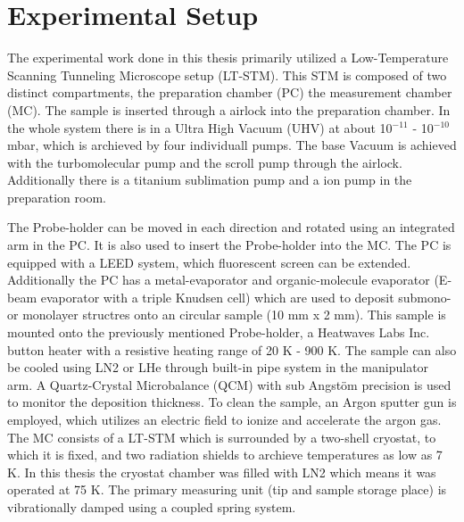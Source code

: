 \chapter{Experimental Setup}
\label{sec:versuchsandordnung}
The experimental work done in this thesis primarily utilized a Low-Temperature Scanning Tunneling Microscope setup (LT-STM).
This STM is composed of two distinct compartments, the preparation chamber (PC) the measurement chamber (MC).
The sample is inserted through a airlock into the preparation chamber.
In the whole system there is in a Ultra High Vacuum (UHV) at about 10$^{-11}$ - 10$^{-10}$ mbar, which is archieved by four individuall pumps.
The base Vacuum is achieved with the turbomolecular pump and the scroll pump through the airlock.
Additionally there is a titanium sublimation pump and a ion pump in the preparation room.


The Probe-holder can be moved in each direction and rotated using an integrated arm in the PC.
It is also used to insert the Probe-holder into the MC.
The PC is equipped with a LEED system, which fluorescent screen can be extended. 
Additionally the PC has a metal-evaporator and organic-molecule evaporator (E-beam evaporator with a triple Knudsen cell) which are used to deposit submono- or monolayer structres onto an circular sample (10 mm x 2 mm).
This sample is mounted onto the previously mentioned Probe-holder, a Heatwaves Labs Inc. button heater with a resistive heating range of 20 K - 900 K.
The sample can also be cooled using LN2 or LHe through built-in pipe system in the manipulator arm.
A Quartz-Crystal Microbalance (QCM) with sub Angstöm precision is used to monitor the deposition thickness.
To clean the sample, an Argon sputter gun is employed, which utilizes an electric field to ionize and accelerate the argon gas.
The MC consists of a LT-STM which is surrounded by a two-shell cryostat, to which it is fixed, and two radiation shields to archieve temperatures as low as 7 K.
In this thesis the cryostat chamber was filled with LN2 which means it was operated at 75 K.
The primary measuring unit (tip and sample storage place) is vibrationally damped using a coupled spring system.


